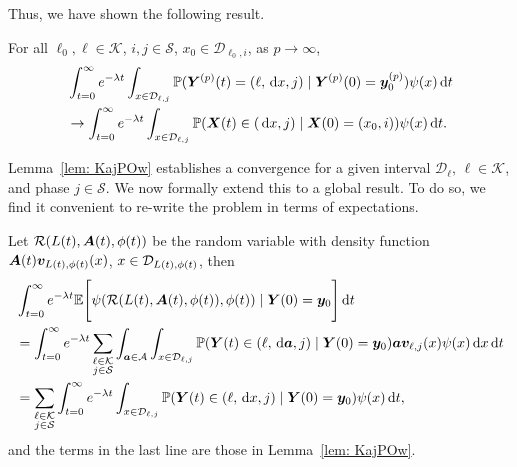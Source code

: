 Thus, we have shown the following result.
\begin{lem}\label{lem: KajPOw}
	For all \(\ell_0,\ell\in\mathcal K\), \(i,j\in\mathcal S\), \(x_0\in\mathcal D_{\ell_0,i}\), as \(p\to\infty\), 
	\begin{align}
		&\int_{t=0}^\infty e^{-\lambda t}\int_{x\in\mathcal D_{\ell,j}}\mathbb P( {\boldsymbol Y}^{(p)}(t) = (\ell,\, \mathrm{d} x,j) \mid \boldsymbol Y^{(p)}(0)=\boldsymbol y_0^{(p)})  \psi(x)\, \mathrm{d} t \nonumber
		\\&\to \int_{t=0}^\infty e^{-\lambda t}  \int_{x\in\mathcal{D}_{\ell,j}} \mathbb P(\boldsymbol X(t)\in(\, \mathrm{d} x, j)  
		\mid \boldsymbol X(0)=(x_0, i))\psi(x)\, \mathrm{d} t. \nonumber
	\end{align}
\end{lem}

Lemma~\ref{lem: KajPOw} establishes a convergence for a given interval \(\mathcal D_\ell,\, \ell\in\mathcal K\), and phase \(j\in\mathcal S\). We now formally extend this to a global result. To do so, we find it convenient to re-write the problem in terms of expectations. 
 
Let \(\mathcal R(L(t),\boldsymbol A(t),\phi(t))\) be the random variable with density function \(\boldsymbol A(t)\boldsymbol v_{L(t),\phi(t)}(x)\), \(x\in\mathcal{D}_{L(t),\phi(t)}\), then
\begin{align}
	&\int_{t=0}^\infty e^{-\lambda t}\mathbb E\Bigg[\psi(\mathcal R(L(t),\boldsymbol A(t),\phi(t)),\phi(t) )  \mid \nonumber
	\boldsymbol Y (0)=\boldsymbol y_0 \Bigg] \, \mathrm{d} t 
	\\&=\int_{t=0}^\infty e^{-\lambda t}\sum_{\substack{\ell\in\mathcal K\\j\in\mathcal{S}}}\int_{\boldsymbol a\in\mathcal A}\int_{x\in\mathcal{D}_{\ell,j}}\mathbb P( {\boldsymbol Y}(t) \in (\ell,\, \mathrm{d} \boldsymbol a,j) \mid \boldsymbol Y(0)=\boldsymbol y_0)\boldsymbol a\boldsymbol v_{\ell,j}(x)  \psi(x)\, \mathrm{d} x\, \mathrm{d} t \nonumber 
	\\&=\sum_{\substack{\ell\in\mathcal K\\j\in\mathcal{S}}}\int_{t=0}^\infty e^{-\lambda t}\int_{x\in\mathcal D_{\ell,j}}\mathbb P( {\boldsymbol Y} (t) \in (\ell,\, \mathrm{d} x,j) \mid \boldsymbol Y (0)=\boldsymbol y_0 )  \psi(x)\, \mathrm{d} t,
\end{align}
and the terms in the last line are those in Lemma~\ref{lem: KajPOw}. 

